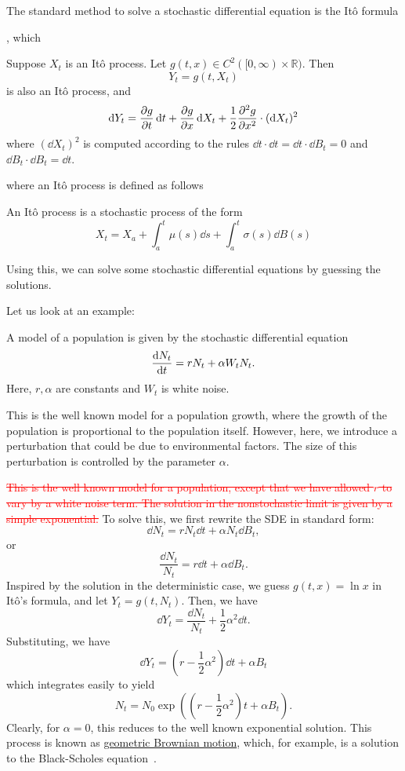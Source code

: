 \documentclass[prb,12pt]{revtex4-2}
\theoremstyle{definition}
\theoremstyle{definition}
\theoremstyle{definition}
\newcommand{\R}{\mathbb{R}}
\begin{document}
	The standard method to solve a stochastic differential equation is the Itô formula {\color{red}, which \begin{Theorem}
			Suppose $X_t$ is an Itô process. Let $g(t,x)\in C^2([0,\infty)\times \R)$. Then
			\[Y_t=g(t, X_t)\]
			is also an Itô process, and
			\[\dd{Y_t}=\pdv{g}{t}(t, X_t)\dd{t}+\pdv{g}{x}(t, X_t)\dd{X_t}+\frac 12 \pdv[2]{g}{x}(t, X_t)\cdot (\dd{X_t})^2\]
			where $(\dd{X_t})^2$ is computed according to the rules $\dd{t}\cdot \dd{t} = \dd{t}\cdot \dd{B_t}=0$ and $\dd{B_t}\cdot \dd{B_t}=\dd{t}$.
		\end{Theorem}
		where an Itô process is defined as follows
		\begin{Definition}
			An Itô process is a stochastic process of the form
			\[X_t = X_a +\int_a^t \mu(s)\dd{s} + \int_a^t \sigma(s)\dd{B(s)}\]
		\end{Definition}
	{\color{red} Using this, we can solve some stochastic differential equations by guessing the solutions.}
	
	Let us look at an example:
	\begin{Example}
		A model of a population is given by the stochastic differential equation
		\[\dv{N_t}{t} = r N_t + \alpha W_t N_t.\]
		Here, $r,\alpha$ are constants and $W_t$ is white noise.
	\end{Example}
	{\color{red} This is the well known model for a population growth, where the growth of the population is proportional to the population itself. However, here, we introduce a perturbation that could be due to environmental factors. The size of this perturbation is controlled by the parameter $\alpha$.}
		
	\textcolor{red}{\sout{This is the well known model for a population, except that we have allowed $r$ to vary by a white noise term. The solution in the nonstochastic limit is given by a simple exponential.}} To solve this, we first rewrite the SDE in standard form:
	\[\dd{N_t}=r N_t\dd{t}+\alpha N_t \dd{B_t},\]
	or
	\[\frac{\dd{N_t}}{N_t} = r \dd{t} + \alpha \dd{B_t}.\]
	Inspired by the solution in the deterministic case, we guess $g(t, x)=\ln x$ in Itô's formula, and let $Y_t=g(t, N_t)$. Then, we have
	\[\dd{Y_t}=\frac{\dd{N_t}}{N_t}+\frac 12 \alpha^2 \dd{t}.\]
	Substituting, we have
	\[\dd{Y_t} = \left(r- \frac 12\alpha^2 \right)\dd{t} +\alpha B_t\]
	which integrates easily to yield
	\[N_t = N_0 \exp\left(\left(r - \frac 12 \alpha^2\right)t+\alpha B_t\right).\]
	Clearly, for $\alpha=0$, this reduces to the well known exponential solution. This process is known as \uline{geometric Brownian motion}, which, for example, is a solution to the Black-Scholes equation~\cite{inbook}.
	
}
\end{document}

